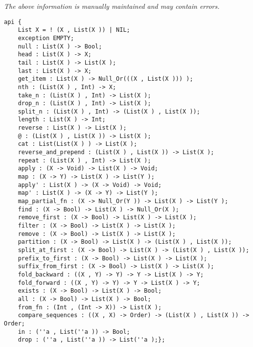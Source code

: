 \label{api:List}

{\tiny \it The above information is manually maintained and may contain errors.}
\begin{verbatim}
api {
    List X = ! (X , List(X )) | NIL;
    exception EMPTY;
    null : List(X ) -> Bool;
    head : List(X ) -> X;
    tail : List(X ) -> List(X );
    last : List(X ) -> X;
    get_item : List(X ) -> Null_Or(((X , List(X ))) );
    nth : (List(X ) , Int) -> X;
    take_n : (List(X ) , Int) -> List(X );
    drop_n : (List(X ) , Int) -> List(X );
    split_n : (List(X ) , Int) -> (List(X ) , List(X ));
    length : List(X ) -> Int;
    reverse : List(X ) -> List(X );
    @ : (List(X ) , List(X )) -> List(X );
    cat : List(List(X ) ) -> List(X );
    reverse_and_prepend : (List(X ) , List(X )) -> List(X );
    repeat : (List(X ) , Int) -> List(X );
    apply : (X -> Void) -> List(X ) -> Void;
    map : (X -> Y) -> List(X ) -> List(Y );
    apply' : List(X ) -> (X -> Void) -> Void;
    map' : List(X ) -> (X -> Y) -> List(Y );
    map_partial_fn : (X -> Null_Or(Y )) -> List(X ) -> List(Y );
    find : (X -> Bool) -> List(X ) -> Null_Or(X );
    remove_first : (X -> Bool) -> List(X ) -> List(X );
    filter : (X -> Bool) -> List(X ) -> List(X );
    remove : (X -> Bool) -> List(X ) -> List(X );
    partition : (X -> Bool) -> List(X ) -> (List(X ) , List(X ));
    split_at_first : (X -> Bool) -> List(X ) -> (List(X ) , List(X ));
    prefix_to_first : (X -> Bool) -> List(X ) -> List(X );
    suffix_from_first : (X -> Bool) -> List(X ) -> List(X );
    fold_backward : ((X , Y) -> Y) -> Y -> List(X ) -> Y;
    fold_forward : ((X , Y) -> Y) -> Y -> List(X ) -> Y;
    exists : (X -> Bool) -> List(X ) -> Bool;
    all : (X -> Bool) -> List(X ) -> Bool;
    from_fn : (Int , (Int -> X)) -> List(X );
    compare_sequences : ((X , X) -> Order) -> (List(X ) , List(X )) -> Order;
    in : (''a , List(''a )) -> Bool;
    drop : (''a , List(''a )) -> List(''a );};
\end{verbatim}
\index[fun]{\@}
